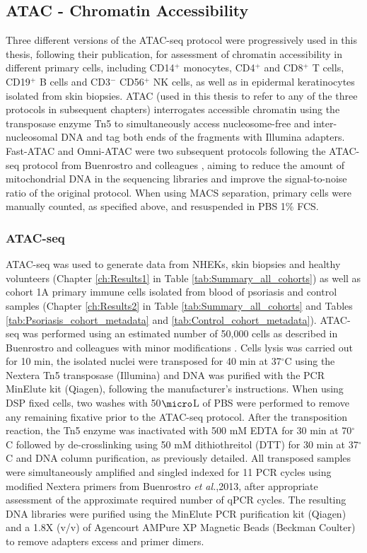 \subsection{ATAC - Chromatin Accessibility}
\label{all_ATAC}
Three different versions of the ATAC-seq protocol were progressively used in this thesis, following their publication, for assessment of chromatin accessibility in different primary cells, including CD14$^{+}$ monocytes, CD4$^+$ and CD8$^+$ T cells, CD19$^+$ B cells and CD3$^-$ CD56$^+$ NK cells, as well as in epidermal keratinocytes isolated from skin biopsies. ATAC (used in this thesis to refer to any of the three protocols in subsequent chapters) interrogates accessible chromatin using the transposase enzyme Tn5 to simultaneously access nucleosome-free and inter-nucleosomal DNA and tag both ends of the fragments with Illumina adapters. Fast-ATAC and Omni-ATAC were two subsequent protocols following the ATAC-seq protocol from Buenrostro and colleagues \parencite{Buenrostro2013}, aiming to reduce the amount of mitochondrial DNA in the sequencing libraries and improve the signal-to-noise ratio of the original protocol. When using MACS separation, primary cells were manually counted, as specified above, and resuspended in PBS 1\% FCS.

\subsubsection{ATAC-seq}

ATAC-seq was used to generate data from NHEKs, skin biopsies and healthy volunteers (Chapter \ref{ch:Results1} in Table \ref{tab:Summary_all_cohorts}) as well as cohort 1A primary immune cells isolated from blood of psoriasis and control samples (Chapter \ref{ch:Results2} in Table \ref{tab:Summary_all_cohorts} and Tables \ref{tab:Psoriasis_cohort_metadata} and \ref{tab:Control_cohort_metadata}). ATAC-seq was performed using an estimated number of 50,000 cells as described in Buenrostro and colleagues with minor modifications \parencite{Buenrostro2013}. Cells lysis was carried out for 10 min, the isolated nuclei were transposed for 40 min at 37{$^\circ$}C using the Nextera Tn5 transposase (Illumina) and DNA was purified with the PCR MinElute kit (Qiagen), following the manufacturer's instructions. When using DSP fixed cells, two washes with 50$\micro$L of PBS were performed to remove any remaining fixative prior to the ATAC-seq protocol. After the transposition reaction, the Tn5 enzyme was inactivated with 500 mM EDTA for 30 min at 70{$^\circ$}C followed by de-crosslinking using 50 mM dithiothreitol (DTT) for 30 min at 37{$^\circ$}C and DNA column purification, as previously detailed.  All transposed samples were simultaneously amplified and singled indexed for 11 PCR cycles using modified Nextera primers from Buenrostro \textit{et al.},2013, after appropriate assessment of the approximate required number of qPCR cycles. The resulting DNA libraries were purified using the MinElute PCR purification kit (Qiagen) and a 1.8X (v/v) of Agencourt AMPure XP Magnetic Beads (Beckman Coulter) to remove adapters excess and primer dimers.

